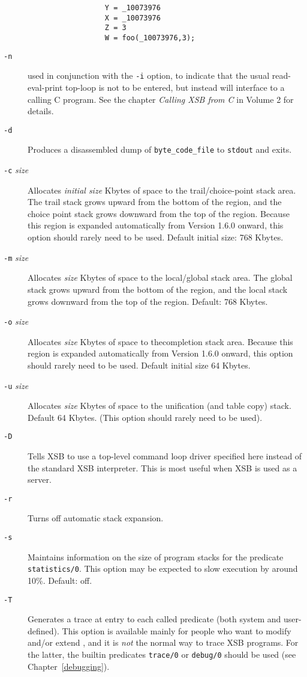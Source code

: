 \begin{description}
\begin{verbatim}
                  Y = _10073976
                  X = _10073976
                  Z = 3
                  W = foo(_10073976,3);
	\end{verbatim}
\item[{\tt -n}] used in conjunction with the {\tt -i} option, to
    indicate that the usual read-eval-print top-loop is not to be
    entered, but instead will interface to a calling C program.  See
    the chapter {\it Calling XSB from C} in Volume 2  for details.
\item[{\tt -d}] Produces a disassembled dump of {\tt byte\_code\_file} to 
    {\tt stdout} and exits.
\item[{\tt -c} {\em size}] Allocates {\em initial  size\/} Kbytes of space
    to the trail/choice-point stack area.  The trail stack grows
    upward from the bottom of the region, and the choice point stack
    grows downward from the top of the region.  Because this region is
    expanded automatically from Version 1.6.0 onward, this option
    should rarely need to be used.  Default initial size: 768 Kbytes.
\item[{\tt -m} {\em size}] Allocates {\em size\/} Kbytes
    of space to the local/global stack area.  The global stack grows 
    upward from the bottom of the region, and the local stack grows 
    downward from the top of the region.  Default: 768 Kbytes.
\item[{\tt -o} {\em size}] Allocates {\em size\/} Kbytes of space
    to thecompletion stack area.  Because this region is expanded
    automatically from Version 1.6.0 onward, this option should rarely
    need to be used. Default initial size 64 Kbytes.
\item[{\tt -u} {\em size}] Allocates {\em size} Kbytes of space
    to the unification (and table copy) stack.  Default 64 Kbytes.
    (This option should rarely need to be used).
\item[{\tt -D}] Tells XSB to use a top-level command loop driver specified
  here instead of the standard XSB interpreter. This is most useful when
  XSB is used as a server.
\item[{\tt -r}] Turns off automatic stack expansion.
\item[{\tt -s}] Maintains information on the size of program stacks 
    for the predicate {\tt statistics/0}.  This option may be expected
    to slow execution by around 10\%.  Default: off.
\item[{\tt -T}] Generates a trace at entry to each called predicate
    (both system and user-defined).  This option is available mainly
    for people who want to modify and/or extend \ourprolog, and it is
    {\em not\/} the normal way to trace XSB programs.  For the
    latter, the builtin predicates {\tt trace/0} or {\tt debug/0}
    should be used (see Chapter~\ref{debugging}).


\end{description}
